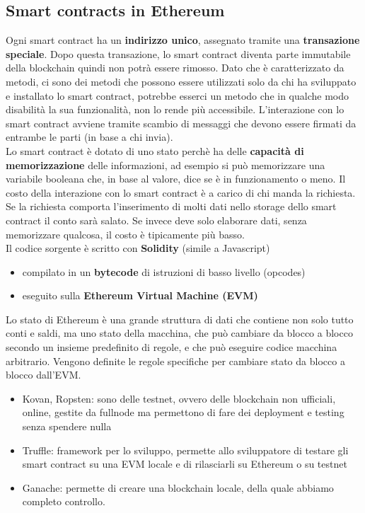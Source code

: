 \subsection{Smart contracts in Ethereum}
Ogni smart contract ha un \textbf{indirizzo unico}, assegnato tramite una \textbf{transazione speciale}. Dopo questa transazione, lo smart contract diventa parte immutabile della blockchain quindi non potrà essere rimosso. Dato che è caratterizzato da metodi, ci sono dei metodi che possono essere utilizzati solo da chi ha sviluppato e installato lo smart contract, potrebbe esserci un metodo che in qualche modo disabilità la sua funzionalità, non lo rende più accessibile.   
L'interazione con lo smart contract avviene tramite scambio di messaggi che devono essere firmati da entrambe le parti (in base a chi invia). \\

Lo smart contract è dotato di uno stato perchè ha delle \textbf{capacità di memorizzazione} delle informazioni, ad esempio si può memorizzare una variabile booleana che, in base al valore, dice se è in funzionamento o meno. Il costo della interazione con lo smart contract è a carico di chi manda la richiesta. Se la richiesta comporta l'inserimento di molti dati nello storage dello smart contract il conto sarà salato. Se invece deve solo elaborare dati, senza memorizzare qualcosa, il costo è tipicamente più basso. \\

Il codice sorgente è scritto con \textbf{Solidity} (simile a Javascript)
\begin{itemize}
    \item compilato in un \textbf{bytecode} di istruzioni di basso livello (opcodes)
    \item eseguito sulla \textbf{Ethereum Virtual Machine (EVM)}
\end{itemize}
Lo stato di Ethereum è una grande struttura di dati che contiene non solo tutto
conti e saldi, ma uno stato della macchina, che può cambiare
da blocco a blocco secondo un insieme predefinito di regole, e
che può eseguire codice macchina arbitrario.
Vengono definite le regole specifiche per cambiare stato da blocco a blocco
dall'EVM.

\begin{itemize}
    \item Kovan, Ropsten: sono delle testnet, ovvero delle blockchain non ufficiali, online, gestite da fullnode ma permettono di fare dei deployment e testing senza spendere nulla
    \item Truffle: framework per lo sviluppo, permette allo sviluppatore di testare gli smart contract su una EVM locale e di rilasciarli su Ethereum o su testnet 
    \item Ganache: permette di creare una blockchain locale, della quale abbiamo completo controllo. 
\end{itemize}


